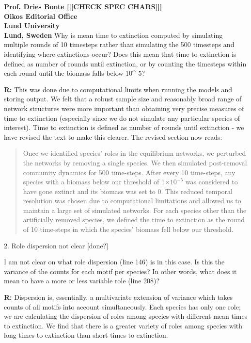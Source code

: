 \documentclass[12pt]{letter}
\begin{document}
\begin{letter}{\bf Prof. Dries Bonte [[[CHECK SPEC CHARS]]]\\
Oikos Editorial Office \\
Lund University \\
Lund, Sweden}
    Why is mean time to extinction computed by simulating multiple rounds of 10 timesteps rather than simulating the 500 timesteps and identifying where extinctions occur? Does this mean that time to extinction is defined as number of rounds until extinction, or by counting the timesteps within each round until the biomass falls below 10^-5? 

    \textbf{R:} This was done due to computational limits when running the models and storing output. We felt that a robust sample size and reasonably broad range of network structures were more important than obtaining very precise measures of time to extinction (especially since we do not simulate any particular species of interest). Time to extinction is defined as number of rounds until extinction - we have revised the text to make this clearer. The revised section now reads:

    \begin{quotation}

            Once we identified species' roles in the equilibrium networks, we perturbed the networks by removing a single species. 
            We then simulated post-removal community dynamics for 500 time-steps.
            After every 10 time-steps, any species with a biomass below our threshold of 1$\times10^{-5}$ was considered to have gone extinct and its biomass was set to 0.
            This reduced temporal resolution was chosen due to computational limitations and allowed us to maintain a large set of simulated networks.
            For each species other than the artificially removed species, we defined the time to extinction as the round of 10 time-steps in which the species' biomass fell below our threshold. 

    \end{quotation}


  2. Role dispersion not clear [done?]


    I am not clear on what role dispersion (line 146) is in this case. Is this the variance of the counts for each motif per species? In other words, what does it mean to have a more or less variable role (line 208)?

    \textbf{R:} Dispersion is, essentially, a multivariate extension of variance which takes counts of all motifs into account simultaneously. 
    Each species has only one role; we are calculating the dispersion of roles among species with different mean times to extinction. We find that there is a greater variety of roles among species with long times to extinction than short times to extinction. 



\end{letter}
\end{document}
